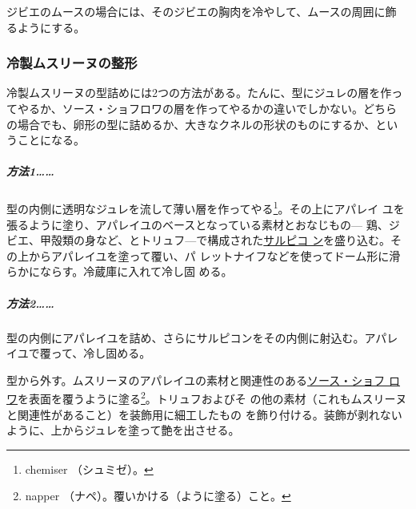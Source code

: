 \begin{recette}
ジビエのムースの場合には、そのジビエの胸肉を冷やして、ムースの周囲に飾
るようにする。

\hypertarget{moulage-des-mousselines-froides}{%
\subsubsection{冷製ムスリーヌの整形}\label{moulage-des-mousselines-froides}}



冷製ムスリーヌの型詰めには2つの方法がある。たんに、型にジュレの層を作っ
てやるか、ソース・ショフロワの層を作ってやるかの違いでしかない。どちら
の場合でも、卵形の型に詰めるか、大きなクネルの形状のものにするか、とい
うことになる。

\hypertarget{procede-un-moulage-des-mousselines-froides}{%
\subparagraph{方法1\ldots{}\ldots{}}\label{procede-un-moulage-des-mousselines-froides}}

型の内側に透明なジュレを流して薄い層を作ってやる\footnote{chemiser
  （シュミゼ）。}。その上にアパレイ
ユを張るように塗り、アパレイユのベースとなっている素材とおなじもの---
鶏、ジビエ、甲殻類の身など、とトリュフ---で構成された\protect\hyperlink{salpicons-divers}{サルピコ
ン}を盛り込む。その上からアパレイユを塗って覆い、パ
レットナイフなどを使ってドーム形に滑らかにならす。冷蔵庫に入れて冷し固
める。

\hypertarget{procede-deux-moulage-des-mousselines-froides}{%
\subparagraph{方法2\ldots{}\ldots{}}\label{procede-deux-moulage-des-mousselines-froides}}

型の内側にアパレイユを詰め、さらにサルピコンをその内側に射込む。アパレ
イユで覆って、冷し固める。

型から外す。ムスリーヌのアパレイユの素材と関連性のある\protect\hyperlink{sauce-chaud-froid-ordinaire}{ソース・ショフ
ロワ}を表面を覆うように塗る\footnote{napper
  （ナペ）。覆いかける（ように塗る）こと。}。トリュフおよびそ
の他の素材（これもムスリーヌと関連性があること）を装飾用に細工したもの
を飾り付ける。装飾が剥れないように、上からジュレを塗って艶を出させる。


\end{recette}
